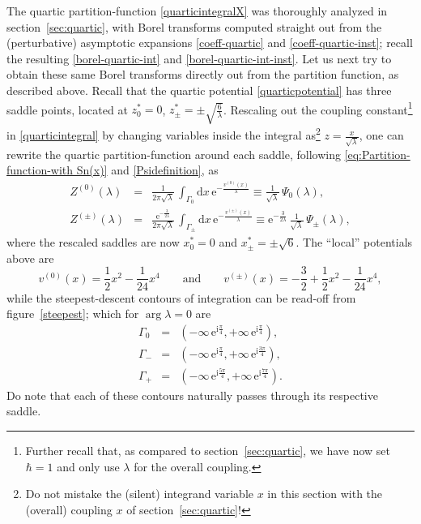 \documentclass[11pt,a4paper]{article}
\newcommand{\rme}{{\mathrm{e}}}
\newcommand{\rmi}{{\mathrm{i}}}
\newcommand{\rmd}{{\mathrm{d}}}
\begin{document}
The quartic partition-function \eqref{quarticintegralX} was thoroughly analyzed in section~\ref{sec:quartic}, with Borel transforms computed straight out from the (perturbative) asymptotic expansions \eqref{coeff-quartic} and \eqref{coeff-quartic-inst}; recall the resulting \eqref{borel-quartic-int} and \eqref{borel-quartic-int-inst}. Let us next try to obtain these same Borel transforms directly out from the partition function, as described above. Recall that the quartic potential \eqref{quarticpotential} has three saddle points, located at $z^*_0 = 0$, $z^*_{\pm} = \pm \sqrt{\frac{6}{\lambda}}$. Rescaling out the coupling constant\footnote{Further recall that, as compared to section~\ref{sec:quartic}, we have now set $\hbar=1$ and only use $\lambda$ for the overall coupling.} in \eqref{quarticintegral} by changing variables inside the integral as\footnote{Do not mistake the (silent) integrand variable $x$ in this section with the (overall) coupling $x$ of section~\ref{sec:quartic}!} $z = \frac{x}{\sqrt{\lambda}}$, one can rewrite the quartic partition-function around each saddle, following \eqref{eq:Partition-function-with Sn(x)} and \eqref{Psidefinition}, as
%
\begin{eqnarray}
Z^{(0)} (\lambda) &=& \frac{1}{2\pi \sqrt{\lambda}}\, \int_{\Gamma_{0}} \rmd x\, \rme^{- \frac{v^{(0)}(x)}{\lambda}} \equiv \frac{1}{\sqrt{\lambda}}\, \Psi_{0} (\lambda), \\
Z^{(\pm)} (\lambda) &=& \frac{\rme^{- \frac{3}{2\lambda}}}{2\pi \sqrt{\lambda}}\, \int_{\Gamma_{\pm}} \rmd x\, \rme^{- \frac{v^{(\pm)}(x)}{\lambda}} \equiv \rme^{- \frac{3}{2\lambda}}\, \frac{1}{\sqrt{\lambda}}\, \Psi_{\pm} (\lambda),
\end{eqnarray}
%
\noindent
where the rescaled saddles are now $x^*_0 = 0$ and $x^*_{\pm} = \pm \sqrt{6}$. The ``local'' potentials above are
%
\begin{equation}
v^{(0)} (x) = \frac{1}{2} x^2 - \frac{1}{24} x^{4} \qquad \text{and} \qquad 
v^{(\pm)} (x) = - \frac{3}{2} + \frac{1}{2} x^2 - \frac{1}{24} x^4,
\end{equation}
%
\noindent
while the steepest-descent contours of integration can be read-off from figure~\ref{steepest}; which for $\arg\lambda=0$ are
%
\begin{eqnarray}
\Gamma_{0} &=& \left( - \infty\, \rme^{\rmi\frac{\pi}{4}}, + \infty\, \rme^{\rmi \frac{\pi}{4}} \right), \\
\Gamma_{-} &=& \left( - \infty\, \rme^{\rmi \frac{\pi}{4}}, + \infty\, \rme^{\rmi \frac{3\pi}{4}} \right), \\
\Gamma_{+} &=& \left( - \infty\, \rme^{\rmi \frac{5\pi}{4}}, + \infty\, \rme^{\rmi \frac{7\pi}{4}} \right).
\end{eqnarray}
%
\noindent
Do note that each of these contours naturally passes through its respective saddle. 
\end{document}
